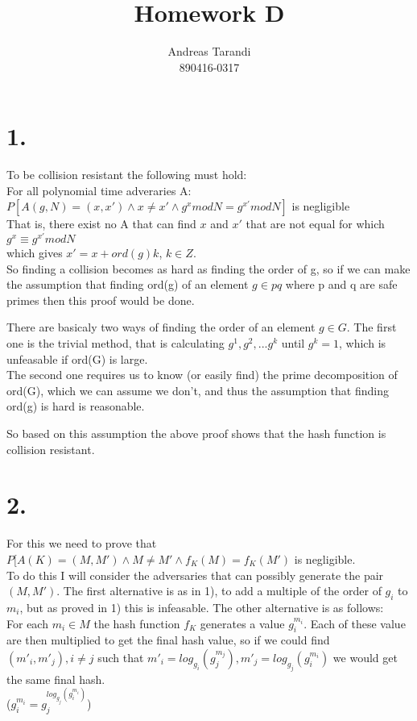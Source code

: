 \documentclass[a4paper,11pt]{article}
\author{Andreas Tarandi\\890416-0317}
\title{Homework D}
\begin{document}
	\maketitle

	\section*{1. }
		To be collision resistant the following must hold:\\
		For all polynomial time adveraries A:
		$P[A(g, N) = (x, x') \wedge x \neq x' \wedge g^x mod N = g^{x'} mod N]$ is negligible\\
		That is, there exist no A that can find $x$ and $x'$ that are not equal for which\\
		$g^x \equiv g^{x'} mod N$\\
		which gives $x' = x + ord(g)k$, $k \in Z$.\\
		So finding a collision becomes as hard as finding the order of g, so if we can make the assumption that finding ord(g) of an element $g \in pq$ where p and q are safe primes then this proof would be done.

		There are basicaly two ways of finding the order of an element $g \in G$. The first one is the trivial method, that is calculating
		$g^1, g^2, ... g^k$ until $g^k = 1$, which is unfeasable if ord(G) is large. \\
		The second one requires us to know (or easily find) the prime decomposition of ord(G), which we can assume we don't, and thus the 
		assumption that finding ord(g) is hard is reasonable.

		So based on this assumption the above proof shows that the hash function is collision resistant.

	\section*{2. }
		For this we need to prove that
		$P[A(K) = (M, M') \wedge M \neq M' \wedge f_K(M) = f_K(M')$ is negligible.\\
		To do this I will consider the adversaries that can possibly generate the pair $(M, M')$. The first alternative is as in 1), to
		add a multiple of the order of $g_i$ to $m_i$, but as proved in 1) this is infeasable. 
		The other alternative is as follows:\\
		For each $m_i \in M$ the hash function $f_K$ generates a value $g_i^{m_i}$. Each of these value are then multiplied to get the
		final hash value, so if we could find $(m'_i, m'_j), i \neq j$ such that $m'_i = log_{g_i}(g_j^{m_j}), m'_j = log_{g_j}(g_i^{m_i})$ 
		we would get the same final hash. \\
		($g_i^{m_i} = g_j^{log_{g_j}(g_i^{m_i})}$)\\
\end{document}
